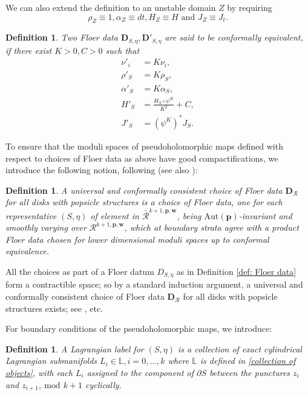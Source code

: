 \documentclass[11pt]{amsproc}
\def\L{{\mathbb L}}
\def\cR{\mathcal{R}}
\def\r#1{\mathrm{#1}}
\def\p{\partial}
\newtheorem{defn}[lem]{Definition}
\theoremstyle{remark}
\numberwithin{equation}{section}
\begin{document}
We can also extend the definition to an unstable domain $Z$ by requiring 
\begin{equation}
\rho_{Z} \equiv 1, \alpha_{Z} \equiv dt, H_{Z} \equiv H \text{ and } J_{Z} \equiv J_{t}.
\end{equation}

\begin{defn}\label{def: conformally equivalent Floer data}
Two Floer data $\mathbf{D}_{S, \eta}, \mathbf{D}'_{S, \eta}$ are said to be conformally equivalent, 
if there exist $K>0, C>0$ such that
\begin{align}
\nu'_{i} & = K \nu_{i}, \\
\rho'_{S} & = K \rho_{S}, \\
\alpha'_{S} & = K \alpha_{S}, \\
H'_{S} &= \frac{H_{S} \circ \psi^{K}}{K^{2}} + C, \\
J'_{S} &= (\psi^{K})^{*} J_{S}.
\end{align}
\end{defn}

To ensure that the moduli spaces of pseudoholomorphic maps defined with respect to choices of Floer data as above have good compactifications, we introduce the following notion, following \cite{abouzaid_gc} (see also \cite[\S 3.5]{GGV}):

\begin{defn}\label{def: universal and conformally consistent choice of Floer data}
A universal and conformally consistent choice of Floer data $\mathbf{D}_{\cR}$ for all disks with popsicle structures is a choice of Floer data,
one for each representative $(S, \eta)$ of element in $\bar{\cR}^{k+1, \mathbf{p}, \mathbf{w}}$, 
being $\r{Aut}(\mathbf{p})$-invariant and smoothly varying over $\cR^{k+1, \mathbf{p}, \mathbf{w}}$, 
which at boundary strata agree with a product Floer data chosen for lower dimensional moduli spaces up to conformal equivalence.
\end{defn}

All the choices as part of a Floer datum $D_{S, \eta}$ as in Definition \ref{def: Floer data} form a contractible space;
so by a standard induction argument, a universal and conformally consistent choice of Floer data $\mathbf{D}_{\cR}$ for all disks with popsicle structures exists; see \cites{abouzaid_gc, seidel_book, ganatra}, etc.

For boundary conditions of the pseudoholomorphic maps, we introduce:

\begin{defn}
A Lagrangian label for $(S, \eta)$ is a collection of exact cylindrical Lagrangian submanifolds $L_{i} \in \L, i = 0, \ldots, k$ where $\L$ is defined in \eqref{collection of objects},
with each $L_{i}$ assigned to the component of $\p S$ between the punctures $z_{i}$ and $z_{i+1}$, $\r{mod}$  $k+1$ cyclically.
\end{defn}
\end{document}

